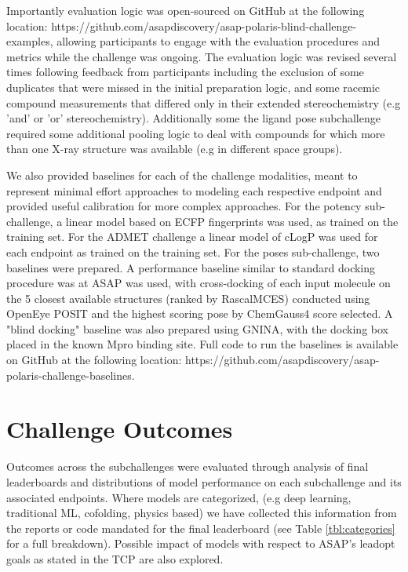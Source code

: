 \documentclass[journal=jcim,manuscript=article]{achemso}
\begin{document}
Importantly evaluation logic was open-sourced on GitHub at the following location: https://github.com/asapdiscovery/asap-polaris-blind-challenge-examples, allowing participants to engage with the evaluation procedures and metrics while the challenge was ongoing. The evaluation logic was revised several times following feedback from participants including the exclusion of some duplicates that were missed in the initial preparation logic, and some racemic compound measurements that differed only in their extended stereochemistry (e.g 'and' or 'or' stereochemistry). Additionally some the ligand pose subchallenge required some additional pooling logic to deal with compounds for which more than one X-ray structure was available (e.g in different space groups). 

We also provided baselines for each of the challenge modalities, meant to represent minimal effort approaches to modeling each respective endpoint and provided useful calibration for more complex approaches. For the potency sub-challenge, a linear model based on ECFP\cite{ecfp_2010} fingerprints was used, as trained on the training set. For the ADMET challenge a linear model of cLogP\cite{clogp_1999} was used for each endpoint as trained on the training set. For the poses sub-challenge, two baselines were prepared. A performance baseline similar to standard docking procedure was at ASAP was used, with cross-docking of each input molecule on the 5 closest available structures (ranked by RascalMCES\cite{raymond_rascal_2002, rdkit}) conducted using OpenEye POSIT\cite{kelley_posit_2015} and the highest scoring pose by ChemGauss4 score selected. A "blind docking" baseline was also prepared using GNINA\cite{mcnutt_gnina_2025}, with the docking box placed in the known Mpro binding site. Full code to run the baselines is available on GitHub at the following location: https://github.com/asapdiscovery/asap-polaris-challenge-baselines.

\section{Challenge Outcomes}

Outcomes across the subchallenges were evaluated through analysis of final leaderboards and distributions of model performance on each subchallenge and its associated endpoints. Where models are categorized, (e.g deep learning, traditional ML, cofolding, physics based) we have collected this information from the reports or code mandated for the final leaderboard (see Table \ref{tbl:categories} for a full breakdown). Possible impact of models with respect to ASAP's leadopt goals as stated in the TCP\cite{sars_mers_tcp} are also explored. 
\end{document}
